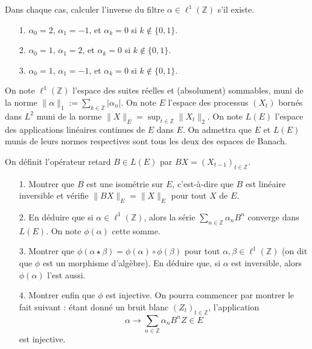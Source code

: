\begin{exercise}[Inversibilité]
Dans chaque cas, calculer l'inverse du filtre $\alpha \in \ell^1(\mathbb{Z})$ s'il existe.
\begin{enumerate}
    \item[1.] $\alpha_0 = 2$, $\alpha_1 = -1$, et $\alpha_k = 0$ si $k \notin \{0, 1\}$.
    \item[2.] $\alpha_0 = 1$, $\alpha_1 = 2$, et $\alpha_k = 0$ si $k \notin \{0, 1\}$.
    \item[3.] $\alpha_0 = 1$, $\alpha_1 = -1$, et $\alpha_k = 0$ si $k \notin \{0, 1\}$.
\end{enumerate}
\end{exercise}

\begin{exercise}
On note $\ell^1(\mathbb{Z})$ l'espace des suites réelles et (absolument) sommables, muni de la norme $\|\alpha\|_1 := \sum_{k \in \mathbb{Z}} |\alpha_n|$. On note $E$ l'espace des processus $(X_t)$ bornés dans $L^2$ muni de la norme $\|X\|_E = \sup_{t \in \mathbb{Z}} \|X_t\|_2$. On note $L(E)$ l'espace des applications linéaires continues de $E$ dans $E$. On admettra que $E$ et $L(E)$ munis de leurs normes respectives sont tous les deux des espaces de Banach.

On définit l'opérateur retard $B \in L(E)$ par $BX = (X_{t-1})_{t \in \mathbb{Z}}$.
\begin{enumerate}
    \item[1.] Montrer que $B$ est une isométrie sur $E$, c'est-à-dire que $B$ est linéaire inversible et vérifie $\|BX\|_E = \|X\|_E$ pour tout $X$ de $E$.
    \item[2.] En déduire que si $\alpha \in \ell^1(\mathbb{Z})$, alors la série $\sum_{n \in \mathbb{Z}} \alpha_n B^n$ converge dans $L(E)$. On note $\phi(\alpha)$ cette somme.
    \item[3.] Montrer que $\phi(\alpha \star \beta) = \phi(\alpha) \circ \phi(\beta)$ pour tout $\alpha, \beta \in \ell^1(\mathbb{Z})$ (on dit que $\phi$ est un morphisme d'algèbre). En déduire que, si $\alpha$ est inversible, alors $\phi(\alpha)$ l'est aussi.
    \item[4.] Montrer enfin que $\phi$ est injective. On pourra commencer par montrer le fait suivant : étant donné un bruit blanc $(Z_t)_{t \in \mathbb{Z}}$, l'application
    \[
    \alpha \longrightarrow \sum_{n \in \mathbb{Z}} \alpha_n B^n Z \in E
    \]
    est injective.
\end{enumerate}
\end{exercise}